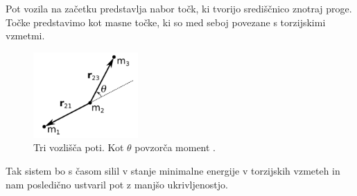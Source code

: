 \documentclass[10pt,a4paper]{article}
\begin{document}
Pot vozila na začetku predstavlja nabor točk, ki tvorijo središčnico znotraj proge. Točke predstavimo kot masne točke, ki so med seboj povezane s torzijskimi vzmetmi.

\begin{figure}[H]
	\centering
	\includegraphics[width=4cm]{pic/slika5.png}
	\caption{Tri vozlišča poti. Kot $\theta$ povzorča moment \cite{VAS}.}
	\label{fig:slika}
\end{figure}

Tak sistem bo s časom silil v stanje minimalne energije v torzijskih vzmeteh in nam posledično ustvaril pot z manjšo ukrivljenostjo.
\end{document}
